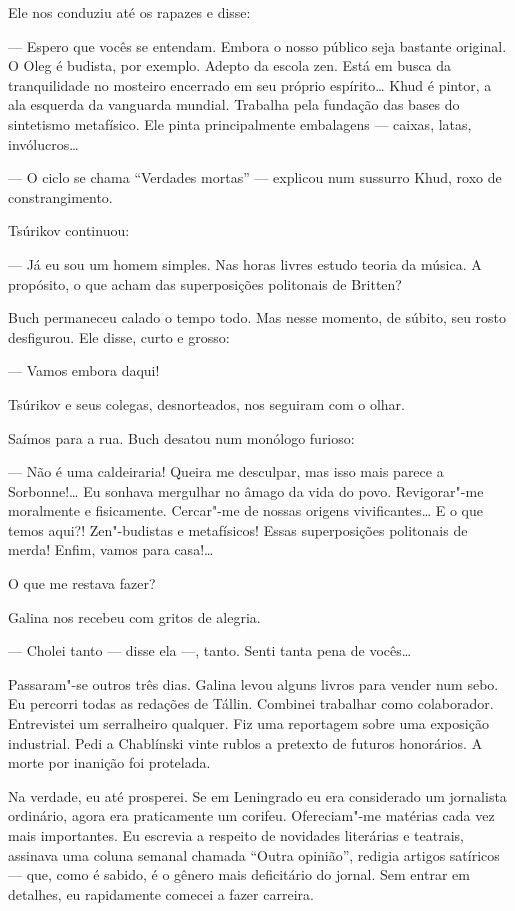 Ele nos conduziu até os rapazes e disse:

--- Espero que vocês se entendam. Embora o nosso público seja bastante
original. O Oleg é budista, por exemplo. Adepto da escola zen. Está em
busca da tranquilidade no mosteiro encerrado em seu próprio espírito\ldots{}
Khud é pintor, a ala esquerda da vanguarda mundial. Trabalha pela
fundação das bases do sintetismo metafísico. Ele pinta principalmente
embalagens --- caixas, latas, invólucros\ldots{}

--- O ciclo se chama ``Verdades mortas'' --- explicou num sussurro Khud,
roxo de constrangimento.

Tsúrikov continuou:

--- Já eu sou um homem simples. Nas horas livres estudo teoria da
música. A propósito, o que acham das superposições politonais de
Britten?

Buch permaneceu calado o tempo todo. Mas nesse momento, de súbito, seu
rosto desfigurou. Ele disse, curto e grosso:

--- Vamos embora daqui!

Tsúrikov e seus colegas, desnorteados, nos seguiram com o olhar.

Saímos para a rua. Buch desatou num monólogo furioso:

--- Não é uma caldeiraria! Queira me desculpar, mas isso mais parece a
Sorbonne!\ldots{} Eu sonhava mergulhar no âmago da vida do povo. Revigorar"-me
moralmente e fisicamente. Cercar"-me de nossas origens vivificantes\ldots{} E
o que temos aqui?! Zen"-budistas e metafísicos! Essas superposições
politonais de merda! Enfim, vamos para casa!\ldots{}

O que me restava fazer?

Galina nos recebeu com gritos de alegria.

--- Cholei tanto --- disse ela ---, tanto. Senti tanta pena de vocês\ldots{}

Passaram"-se outros três dias. Galina levou alguns livros para vender num
sebo. Eu percorri todas as redações de Tállin. Combinei trabalhar como
colaborador. Entrevistei um serralheiro qualquer. Fiz uma reportagem
sobre uma exposição industrial. Pedi a Chablínski vinte rublos a
pretexto de futuros honorários. A morte por inanição foi protelada.

Na verdade, eu até prosperei. Se em Leningrado eu era considerado um
jornalista ordinário, agora era praticamente um corifeu. Ofereciam"-me
matérias cada vez mais importantes. Eu escrevia a respeito de novidades
literárias e teatrais, assinava uma coluna semanal chamada
``Outra opinião'', redigia artigos satíricos --- que, como
é sabido, é o gênero mais deficitário do jornal. Sem entrar em detalhes,
eu rapidamente comecei a fazer carreira.

